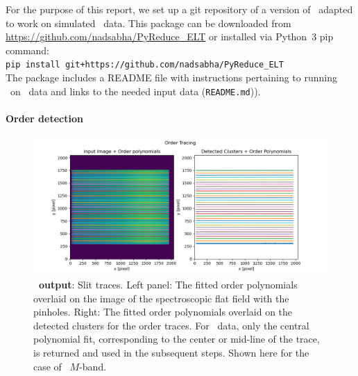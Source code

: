 For the purpose of this report, we set up a git repository of a version of \pyred~adapted to work on simulated \met~data. This package can be downloaded from \url{https://github.com/nadsabha/PyReduce_ELT} or installed via Python~3 pip command: \\
\texttt{pip install git+https://github.com/nadsabha/PyReduce\_ELT} \\
The package includes a README file with instructions pertaining to running \pyred~on \elt~data and links to the needed input data (\texttt{README.md})).


\paragraph{Order detection}\label{sec:critalg_orderdet}

\begin{figure}[!ht]
  \centering
  \includegraphics[width=\textwidth]{figures/LSS_CrtAlg_files/Figure_4.png}
  \caption[PyReduce slit traces]{\textbf{\pyred~output}: Slit traces. Left panel: The fitted order polynomials overlaid on the image of the spectroscopic flat field with the pinholes. Right: The fitted order polynomials overlaid on the detected clusters for the order traces. For \met~data, only the central polynomial fit, corresponding to the center or mid-line of the trace, is returned and used in the subsequent steps. Shown here for the case of \lss~$M$-band. }
  \label{fig:fig3}
\end{figure}

